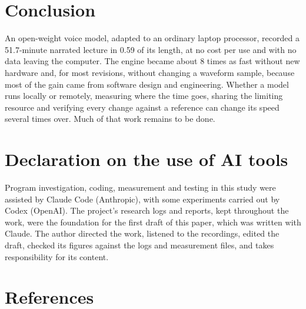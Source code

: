 \documentclass[11pt]{article}
\begin{document}
\hypertarget{conclusion}{%
\section{Conclusion}\label{conclusion}}

An open-weight voice model, adapted to an ordinary laptop processor,
recorded a 51.7-minute narrated lecture in 0.59 of its length, at no
cost per use and with no data leaving the computer. The engine became
about 8 times as fast without new hardware and, for most revisions,
without changing a waveform sample, because most of the gain came from
software design and engineering. Whether a model runs locally or
remotely, measuring where the time goes, sharing the limiting resource
and verifying every change against a reference can change its speed
several times over. Much of that work remains to be done.

\hypertarget{declaration-on-the-use-of-ai-tools}{%
\section*{Declaration on the use of AI
tools}\label{declaration-on-the-use-of-ai-tools}}

Program investigation, coding, measurement and testing in this study
were assisted by Claude Code (Anthropic), with some experiments carried
out by Codex (OpenAI). The project's research logs and reports, kept
throughout the work, were the foundation for the first draft of this
paper, which was written with Claude. The author directed the work,
listened to the recordings, edited the draft, checked its figures
against the logs and measurement files, and takes responsibility for its
content.

\hypertarget{references}{%
\section*{References}\label{references}}
\end{document}
